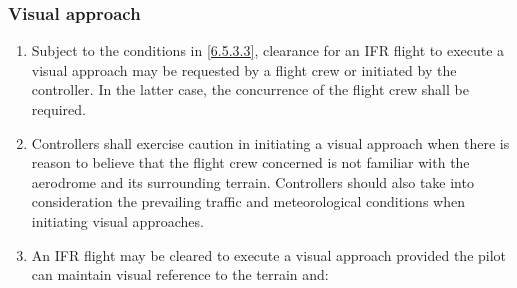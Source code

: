 \documentclass[../vATM.tex]{subfiles}
\begin{document}
    \subsubsection{Visual approach}

    \begin{enumerate}
        \item Subject to the conditions in \ref{6.5.3.3}, clearance for an IFR flight to execute a visual approach may be requested by a flight crew or initiated by the controller. In the latter case, the concurrence of the flight crew shall be required.
        \item Controllers shall exercise caution in initiating a visual approach when there is reason to believe that the flight crew concerned is not familiar with the aerodrome and its surrounding terrain. Controllers should also take into consideration the prevailing traffic and meteorological conditions when initiating visual approaches.
        \item \label{6.5.3.3} An IFR flight may be cleared to execute a visual approach provided the pilot can maintain visual reference to the terrain and:



\end{enumerate}
\end{document}
